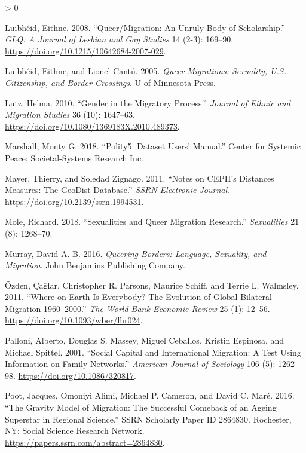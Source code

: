 \documentclass[
  11pt,
]{article}
\newlength{\cslhangindent}
\newenvironment{CSLReferences}[2] %
 {%
  \setlength{\parindent}{0pt}
  \ifodd #1 \everypar{\setlength{\hangindent}{\cslhangindent}}\ignorespaces\fi
  \ifnum #2 > 0
  \setlength{\parskip}{#2\baselineskip}
  \fi
 }%
 {}
\begin{document}
\begin{CSLReferences}{1}{0}
\leavevmode\hypertarget{ref-luibheid_2008}{}%
Luibhéid, Eithne. 2008. {``Queer/{Migration}: {An} {Unruly} {Body} of {Scholarship}.''} \emph{GLQ: A Journal of Lesbian and Gay Studies} 14 (2-3): 169--90. \url{https://doi.org/10.1215/10642684-2007-029}.

\leavevmode\hypertarget{ref-luibheid_2005}{}%
Luibhéid, Eithne, and Lionel Cantú. 2005. \emph{Queer {Migrations}: {Sexuality}, {U}.{S}. {Citizenship}, and {Border} {Crossings}}. U of Minnesota Press.

\leavevmode\hypertarget{ref-lutz_2010}{}%
Lutz, Helma. 2010. {``Gender in the {Migratory} {Process}.''} \emph{Journal of Ethnic and Migration Studies} 36 (10): 1647--63. \url{https://doi.org/10.1080/1369183X.2010.489373}.

\leavevmode\hypertarget{ref-marshall_2018}{}%
Marshall, Monty G. 2018. {``Polity5: {Dataset} {Users}' {Manual}.''} Center for Systemic Peace; Societal-Systems Research Inc.

\leavevmode\hypertarget{ref-mayer_2011}{}%
Mayer, Thierry, and Soledad Zignago. 2011. {``Notes on {CEPII}'s {Distances} {Measures}: {The} {GeoDist} {Database}.''} \emph{SSRN Electronic Journal}. \url{https://doi.org/10.2139/ssrn.1994531}.

\leavevmode\hypertarget{ref-mole_2018a}{}%
Mole, Richard. 2018. {``Sexualities and Queer Migration Research.''} \emph{Sexualities} 21 (8): 1268--70.

\leavevmode\hypertarget{ref-murray_2016}{}%
Murray, David A. B. 2016. \emph{Queering {Borders}: {Language}, {Sexuality}, and {Migration}}. John Benjamins Publishing Company.

\leavevmode\hypertarget{ref-ozden_2011}{}%
Özden, Çağlar, Christopher R. Parsons, Maurice Schiff, and Terrie L. Walmsley. 2011. {``Where on {Earth} Is {Everybody}? {The} {Evolution} of {Global} {Bilateral} {Migration} 1960--2000.''} \emph{The World Bank Economic Review} 25 (1): 12--56. \url{https://doi.org/10.1093/wber/lhr024}.

\leavevmode\hypertarget{ref-palloni_2001}{}%
Palloni, Alberto, Douglas S. Massey, Miguel Ceballos, Kristin Espinosa, and Michael Spittel. 2001. {``Social {Capital} and {International} {Migration}: {A} {Test} {Using} {Information} on {Family} {Networks}.''} \emph{American Journal of Sociology} 106 (5): 1262--98. \url{https://doi.org/10.1086/320817}.

\leavevmode\hypertarget{ref-poot_2016}{}%
Poot, Jacques, Omoniyi Alimi, Michael P. Cameron, and David C. Maré. 2016. {``The {Gravity} {Model} of {Migration}: {The} {Successful} {Comeback} of an {Ageing} {Superstar} in {Regional} {Science}.''} SSRN Scholarly Paper ID 2864830. Rochester, NY: Social Science Research Network. \url{https://papers.ssrn.com/abstract=2864830}.


\end{CSLReferences}
\end{document}
